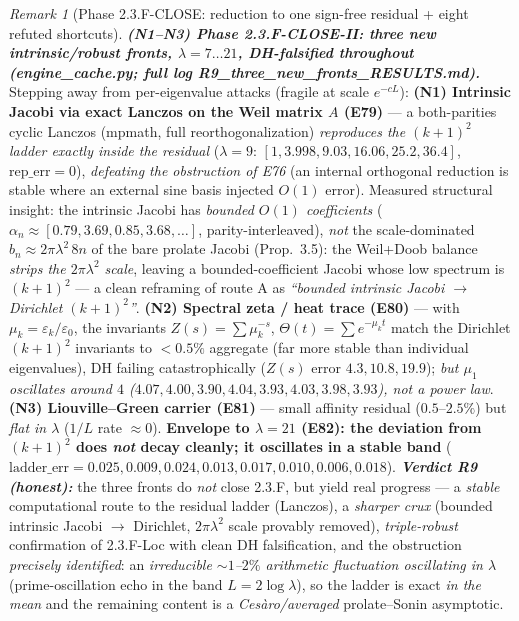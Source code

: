\documentclass[11pt]{amsart}
\theoremstyle{definition}
\theoremstyle{remark}
\newtheorem{remark}[theorem]{Remark}
\newcommand{\ve}{\varepsilon}
\begin{document}
\begin{remark}[Phase 2.3.F-CLOSE: reduction to one sign-free residual + eight refuted shortcuts]
\smallskip
\emph{\textbf{(N1--N3) Phase 2.3.F-CLOSE-II: three new intrinsic/robust fronts, $\lambda=7\!\dots\!21$, DH-falsified throughout (engine\_cache.py; full log R9\_three\_new\_fronts\_RESULTS.md).}} Stepping away from per-eigenvalue attacks (fragile at scale $e^{-cL}$): \textbf{(N1) Intrinsic Jacobi via exact Lanczos on the Weil matrix $A$ (E79)} --- a both-parities cyclic Lanczos (mpmath, full reorthogonalization) \emph{reproduces the $(k+1)^2$ ladder exactly inside the residual} ($\lambda=9$: $[1,3.998,9.03,16.06,25.2,36.4]$, $\mathrm{rep\_err}=0$), \emph{defeating the obstruction of E76} (an internal orthogonal reduction is stable where an external sine basis injected $O(1)$ error). Measured structural insight: the intrinsic Jacobi has \emph{bounded $O(1)$ coefficients} ($\alpha_n\approx[0.79,3.69,0.85,3.68,\dots]$, parity-interleaved), \emph{not} the scale-dominated $b_n\approx2\pi\lambda^2\,8n$ of the bare prolate Jacobi (Prop.~3.5): the Weil+Doob balance \emph{strips the $2\pi\lambda^2$ scale}, leaving a bounded-coefficient Jacobi whose low spectrum is $(k+1)^2$ --- a clean reframing of route A as \emph{``bounded intrinsic Jacobi $\to$ Dirichlet $(k+1)^2$''}. \textbf{(N2) Spectral zeta / heat trace (E80)} --- with $\mu_k=\ve_k/\ve_0$, the invariants $Z(s)=\sum\mu_k^{-s}$, $\Theta(t)=\sum e^{-\mu_k t}$ match the Dirichlet $(k+1)^2$ invariants to $<0.5\%$ aggregate (far more stable than individual eigenvalues), DH failing catastrophically ($Z(s)$ error $4.3,10.8,19.9$); \emph{but $\mu_1$ oscillates around $4$ ($4.07,4.00,3.90,4.04,3.93,4.03,3.98,3.93$), not a power law}. \textbf{(N3) Liouville--Green carrier (E81)} --- small affinity residual ($0.5$--$2.5\%$) but \emph{flat in $\lambda$} ($1/L$ rate $\approx0$). \textbf{Envelope to $\lambda=21$ (E82): the deviation from $(k+1)^2$ does \emph{not} decay cleanly; it oscillates in a stable band} ($\mathrm{ladder\_err}=0.025,0.009,0.024,0.013,0.017,0.010,0.006,0.018$). \emph{\textbf{Verdict R9 (honest):}} the three fronts do \emph{not} close 2.3.F, but yield real progress --- a \emph{stable} computational route to the residual ladder (Lanczos), a \emph{sharper crux} (bounded intrinsic Jacobi $\to$ Dirichlet, $2\pi\lambda^2$ scale provably removed), \emph{triple-robust} confirmation of 2.3.F-Loc with clean DH falsification, and the obstruction \emph{precisely identified}: an \emph{irreducible $\sim\!1$--$2\%$ arithmetic fluctuation oscillating in $\lambda$} (prime-oscillation echo in the band $L=2\log\lambda$), so the ladder is exact \emph{in the mean} and the remaining content is a \emph{Ces\`aro/averaged} prolate--Sonin asymptotic.


\end{remark}
\end{document}
